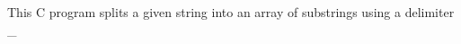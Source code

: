 This C program splits a given string into an array of substrings using a delimiter \textquotesingle{}\+\_\+\textquotesingle{} 